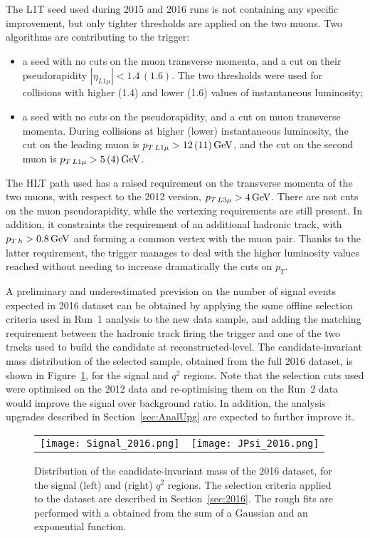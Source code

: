 The L1T seed used during 2015 and 2016 runs is not containing any specific improvement, but only tighter thresholds are applied on the two muons.
Two algorithms are contributing to the trigger:
\begin{itemize}
\item a seed with no cuts on the muon transverse momenta, and a cut on their pseudorapidity $|\eta_{L1\mu}|<1.4\,(1.6)$. The two thresholds were used for collisions with higher (1.4) and lower (1.6) values of instantaneous luminosity;
\item a seed with no cuts on the pseudorapidity, and a cut on muon transverse momenta. During collisions at higher (lower) instantaneous luminosity, the cut on the leading muon is $p_{T\,L1\mu}>12\,(11)\,\textrm{GeV}$, and the cut on the second muon is $p_{T\,L1\mu}>5\,(4)\,\textrm{GeV}$.
\end{itemize}

The HLT path used has a raised requirement on the transverse momenta of the two muons, with respect to the 2012 version, $p_{T\,L3\mu}>4\,\textrm{GeV}$.
There are not cuts on the muon pseudorapidity, while the vertexing requirements are still present.
In addition, it constraints the requirement of an additional hadronic track, with $p_{T\,h}>0.8\,\textrm{GeV}$ and forming a common vertex with the muon pair.
Thanks to the latter requirement, the trigger manages to deal with the higher luminosity values reached without needing to increase dramatically the cuts on $p_T$.

A preliminary and underestimated prevision on the number of signal events expected in 2016 dataset can be obtained by applying the same offline selection criteria used in Run~1 analysis to the new data sample, and adding the matching requirement between the hadronic track firing the trigger and one of the two tracks used to build the candidate at reconstructed-level.
The candidate-\PBz invariant mass distribution of the selected sample, obtained from the full 2016 dataset, is shown in Figure~\ref{fig:prosp-2016}, for the signal and \JPsi $q^2$ regions.
Note that the selection cuts used were optimised on the 2012 data and re-optimising them on the Run~2 data would improve the signal over background ratio.
In addition, the analysis upgrades described in Section~\ref{sec:AnalUpg} are expected to further improve it.

\begin{figure}[!hbt]
  \centering
  \begin{tabular}{cc}
    \texttt{[image: Signal\_2016.png]} &
    \texttt{[image: JPsi\_2016.png]}
  \end{tabular}
  \caption{Distribution of the candidate-\PBz invariant mass of the 2016 dataset, for the signal (left) and \JPsi (right) $q^2$ regions.
    The selection criteria applied to the dataset are described in Section~\ref{sec:2016}.
    The rough fits are performed with a \pdf obtained from the sum of a Gaussian and an exponential function.
  \label{fig:prosp-2016}}
\end{figure}


